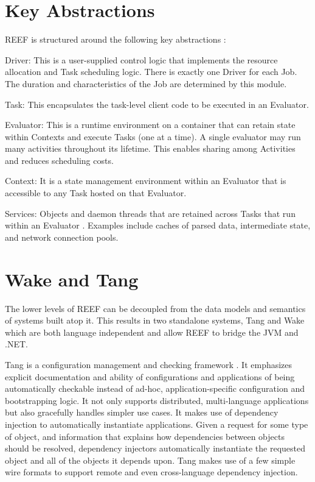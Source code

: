 \documentclass[9pt,twocolumn,twoside]{../../styles/osajnl}
\begin{document}
\section{Key Abstractions}

REEF is structured around the following key abstractions
\cite{reefarticle}:

Driver: This is a user-supplied control logic that implements the
resource allocation and Task scheduling logic. There is exactly one
Driver for each Job. The duration and characteristics of the Job are
determined by this module.

Task: This encapsulates the task-level client code to be executed in
an Evaluator.

Evaluator: This is a runtime environment on a container that can
retain state within Contexts and execute Tasks (one at a time). A
single evaluator may run many activities throughout its lifetime. This
enables sharing among Activities and reduces scheduling costs.

Context: It is a state management environment within an Evaluator that
is accessible to any Task hosted on that Evaluator.

Services: Objects and daemon threads that are retained across Tasks
that run within an Evaluator \cite{reefpaper}. Examples include caches
of parsed data, intermediate state, and network connection pools.

\section{Wake and Tang}

The lower levels of REEF can be decoupled from the data models and
semantics of systems built atop it. This results in two standalone
systems, Tang and Wake which are both language independent and allow
REEF to bridge the JVM and .NET.\newline

Tang is a configuration management and checking framework
\cite{reeftang}. It emphasizes explicit documentation and ability of
configurations and applications of being automatically checkable
instead of ad-hoc, application-specific configuration and
bootstrapping logic. It not only supports distributed, multi-language
applications but also gracefully handles simpler use cases. It makes
use of dependency injection to automatically instantiate
applications. Given a request for some type of object, and information
that explains how dependencies between objects should be resolved,
dependency injectors automatically instantiate the requested object
and all of the objects it depends upon. Tang makes use of a few simple
wire formats to support remote and even cross-language dependency
injection.\newline
\end{document}

